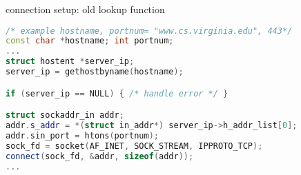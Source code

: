 \begin{frame}[fragile,label=serverLookupClientOld]{connection setup: old lookup function}
\begin{lstlisting}[language=C++,style=smaller]
/* example hostname, portnum= "www.cs.virginia.edu", 443*/
const char *hostname; int portnum;
...
struct hostent *server_ip;
server_ip = gethostbyname(hostname);

if (server_ip == NULL) { /* handle error */ }

struct sockaddr_in addr;
addr.s_addr = *(struct in_addr*) server_ip->h_addr_list[0];
addr.sin_port = htons(portnum);
sock_fd = socket(AF_INET, SOCK_STREAM, IPPROTO_TCP);
connect(sock_fd, &addr, sizeof(addr));
...
\end{lstlisting}
\end{frame}
